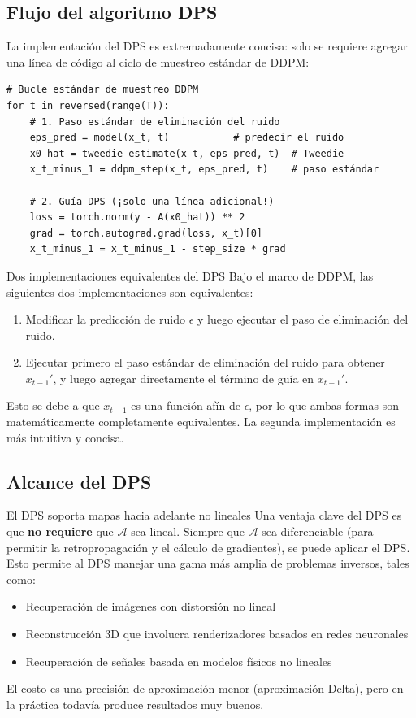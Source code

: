 \documentclass[a4paper]{article}
\begin{document}
\subsection{Flujo del algoritmo DPS}

La implementación del DPS es extremadamente concisa: solo se requiere agregar una línea de código al ciclo de muestreo estándar de DDPM:

\begin{lstlisting}[caption={Pseudocódigo de guía DPS}]
# Bucle estándar de muestreo DDPM
for t in reversed(range(T)):
    # 1. Paso estándar de eliminación del ruido
    eps_pred = model(x_t, t)           # predecir el ruido
    x0_hat = tweedie_estimate(x_t, eps_pred, t)  # Tweedie
    x_t_minus_1 = ddpm_step(x_t, eps_pred, t)    # paso estándar

    # 2. Guía DPS (¡solo una línea adicional!)
    loss = torch.norm(y - A(x0_hat)) ** 2
    grad = torch.autograd.grad(loss, x_t)[0]
    x_t_minus_1 = x_t_minus_1 - step_size * grad
\end{lstlisting}

\begin{importantbox}{Dos implementaciones equivalentes del DPS}
Bajo el marco de DDPM, las siguientes dos implementaciones son equivalentes:
\begin{enumerate}
    \item Modificar la predicción de ruido $\epsilon$ y luego ejecutar el paso de eliminación del ruido.
    \item Ejecutar primero el paso estándar de eliminación del ruido para obtener $x_{t-1}'$, y luego agregar directamente el término de guía en $x_{t-1}'$.
\end{enumerate}
Esto se debe a que $x_{t-1}$ es una función afín de $\epsilon$, por lo que ambas formas son matemáticamente completamente equivalentes. La segunda implementación es más intuitiva y concisa.
\end{importantbox}

\subsection{Alcance del DPS}

\begin{knowledgebox}{El DPS soporta mapas hacia adelante no lineales}
Una ventaja clave del DPS es que \textbf{no requiere} que $\mathcal{A}$ sea lineal. Siempre que $\mathcal{A}$ sea diferenciable (para permitir la retropropagación y el cálculo de gradientes), se puede aplicar el DPS. Esto permite al DPS manejar una gama más amplia de problemas inversos, tales como:
\begin{itemize}
    \item Recuperación de imágenes con distorsión no lineal
    \item Reconstrucción 3D que involucra renderizadores basados en redes neuronales
    \item Recuperación de señales basada en modelos físicos no lineales
\end{itemize}
El costo es una precisión de aproximación menor (aproximación Delta), pero en la práctica todavía produce resultados muy buenos.
\end{knowledgebox}
\end{document}
